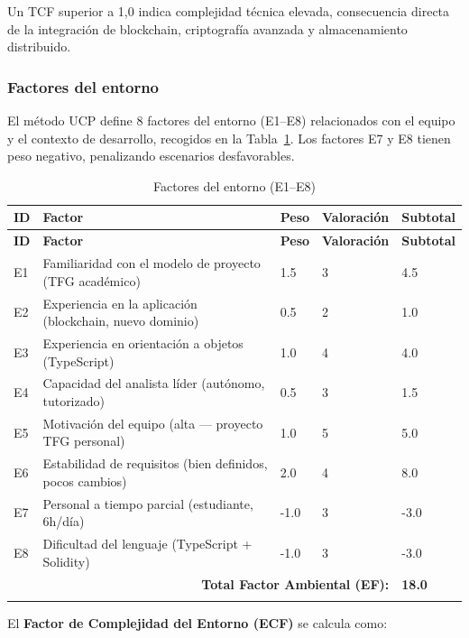 \documentclass[11pt, a4paper]{article}
\begin{document}
Un TCF superior a 1,0 indica complejidad técnica elevada, consecuencia directa de la integración de blockchain, criptografía avanzada y almacenamiento distribuido.

\subsubsection{Factores del entorno}

El método UCP define 8 factores del entorno (E1--E8) relacionados con el equipo y el contexto de desarrollo, recogidos en la Tabla~\ref{tab:factores-entorno}. Los factores E7 y E8 tienen peso negativo, penalizando escenarios desfavorables.

\begin{longtable}{|p{0.8cm}|p{7.5cm}|p{1.3cm}|p{1.8cm}|p{2cm}|}
\hline
\textbf{ID} & \textbf{Factor} & \textbf{Peso} & \textbf{Valoración} & \textbf{Subtotal} \\
\hline
\endfirsthead
\hline
\textbf{ID} & \textbf{Factor} & \textbf{Peso} & \textbf{Valoración} & \textbf{Subtotal} \\
\hline
\endhead
E1 & Familiaridad con el modelo de proyecto (TFG académico) & 1.5 & 3 & 4.5 \\
\hline
E2 & Experiencia en la aplicación (blockchain, nuevo dominio) & 0.5 & 2 & 1.0 \\
\hline
E3 & Experiencia en orientación a objetos (TypeScript) & 1.0 & 4 & 4.0 \\
\hline
E4 & Capacidad del analista líder (autónomo, tutorizado) & 0.5 & 3 & 1.5 \\
\hline
E5 & Motivación del equipo (alta --- proyecto TFG personal) & 1.0 & 5 & 5.0 \\
\hline
E6 & Estabilidad de requisitos (bien definidos, pocos cambios) & 2.0 & 4 & 8.0 \\
\hline
E7 & Personal a tiempo parcial (estudiante, 6h/día) & -1.0 & 3 & -3.0 \\
\hline
E8 & Dificultad del lenguaje (TypeScript + Solidity) & -1.0 & 3 & -3.0 \\
\hline
\multicolumn{4}{|r|}{\textbf{Total Factor Ambiental (EF):}} & \textbf{18.0} \\
\hline
\caption{Factores del entorno (E1--E8)}\label{tab:factores-entorno}
\end{longtable}

\vspace{0.5em}
\noindent El \textbf{Factor de Complejidad del Entorno (ECF)} se calcula como:
\end{document}
